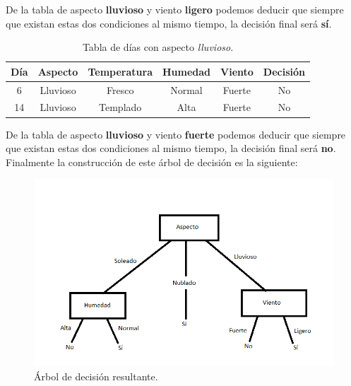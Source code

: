 \begin{UClist}
	De la tabla de aspecto \textbf{lluvioso} y viento \textbf{ligero} podemos deducir que siempre que existan estas dos condiciones al mismo tiempo, la decisión final será \textbf{sí}.\\

	\begin{table}[H]
		\begin{center}
			\label{tab:tablaInduccionAspectoLluvioso}
			\begin{tabular}{c|c|c|c|c|c}
				\textbf{Día} & \textbf{Aspecto} & \textbf{Temperatura} & \textbf{Humedad} & \textbf{Viento} & \textbf{Decisión}\\
				\hline
				6 & Lluvioso & Fresco & Normal & Fuerte & No\\
				14 & Lluvioso & Templado & Alta & Fuerte & No\\
			\end{tabular}
		\end{center}
		\caption{Tabla de días con aspecto \emph{lluvioso}.}
	\end{table}

	De la tabla de aspecto \textbf{lluvioso} y viento \textbf{fuerte} podemos deducir que siempre que existan estas dos condiciones al mismo tiempo, la decisión final será \textbf{no}.\\

	\UCli Finalmente la construcción de este árbol de decisión es la siguiente:

	\begin{figure}[H]
		\hypertarget{fig:arbol-decision-final}{\hspace{1pt}}
		\begin{center}
			\includegraphics{capitulo2/images/arbol-decision-final.png}
			\caption{Árbol de decisión resultante.}
			\label{fig:arbol-decision-final}
		\end{center}
	\end{figure}

\end{UClist}


